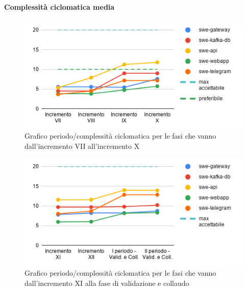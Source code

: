 \paragraph{Complessità ciclomatica media}
	\begin{figure}[H]
			\centering
			\includegraphics[width=0.8\linewidth]{./res/images/QM-PROD-11-COCIM.png}
			\caption{Grafico periodo/complessità ciclomatica per le fasi che vanno dall'incremento VII all'incremento X}
			\label{fig:Grafico periodo/complessità ciclomatica per le fasi che vanno dall'incremento VII all'incremento X}
	\end{figure}
	\begin{figure}[H]
			\centering
			\includegraphics[width=0.8\linewidth]{./res/images/QM-PROD-11-COCIM_1.png}
			\caption{Grafico periodo/complessità ciclomatica per le fasi che vanno dall'incremento XI alla fase di validazione e collaudo}
			\label{fig:Grafico periodo/complessità ciclomatica per le fasi che vanno dall'incremento XI alla fase di validazione e collaudo}
	\end{figure}

